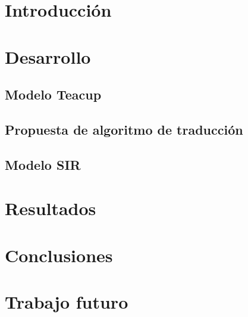 \documentclass[11pt, a4paper]{article}
\begin{document}

\maketitle
\newpage

\tableofcontents
\newpage

%
\section{Introducción}


\section{Desarrollo}

\subsection{Modelo Teacup}

\subsection{Propuesta de algoritmo de traducción}


\subsection{Modelo SIR}


\section{Resultados}


\section{Conclusiones}


\section{Trabajo futuro}


\clearpage
\addappheadtotoc
\appendix
\appendixpage






\end{document}

